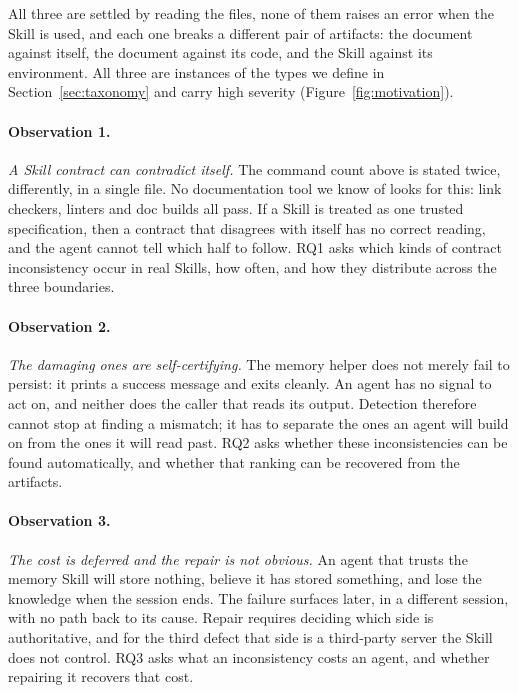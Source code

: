 All three are settled by reading the files, none of them raises an error when
the Skill is used, and each one breaks a different pair of artifacts: the
document against itself, the document against its code, and the Skill against
its environment. All three are instances of the types we define in
Section~\ref{sec:taxonomy} and carry high severity
(Figure~\ref{fig:motivation}).

\paragraph{Observation 1.} \emph{A Skill contract can contradict itself.} The
command count above is stated twice, differently, in a single file. No
documentation tool we know of looks for this: link checkers, linters and doc
builds all pass. If a Skill is treated as one trusted specification, then a
contract that disagrees with itself has no correct reading, and the agent cannot
tell which half to follow. RQ1 asks which kinds of contract inconsistency occur
in real Skills, how often, and how they distribute across the three boundaries.

\paragraph{Observation 2.} \emph{The damaging ones are self-certifying.} The
memory helper does not merely fail to persist: it prints a success message and
exits cleanly. An agent has no signal to act on, and neither does the caller that
reads its output. Detection therefore cannot stop at finding a mismatch; it has
to separate the ones an agent will build on from the ones it will read past. RQ2
asks whether these inconsistencies can be found automatically, and whether that
ranking can be recovered from the artifacts.

\paragraph{Observation 3.} \emph{The cost is deferred and the repair is not
obvious.} An agent that trusts the memory Skill will store nothing, believe it
has stored something, and lose the knowledge when the session ends. The failure
surfaces later, in a different session, with no path back to its cause. Repair
requires deciding which side is authoritative, and for the third defect that
side is a third-party server the Skill does not control. RQ3 asks what an
inconsistency costs an agent, and whether repairing it recovers that cost.
\endgroup
